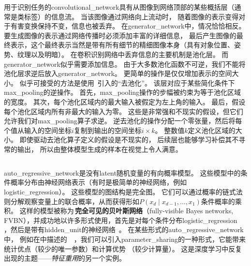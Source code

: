 用于识别任务的\gls{convolutional_network}具有从图像到网络顶部的某些概括层（通常是类标签）的信息流。
当该图像通过网络向上流动时， 随着图像的表示变得对于有害变换保持不变，信息也被丢弃。
在\gls{generator_network}中，情况恰恰相反。
要生成图像的表示通过网络传播时必须添加丰富的详细信息， 最后产生图像的最终表示，这个最终表示当然是带有所有细节的精细图像本身（具有对象位置、姿势、纹理以及明暗）。
在卷积识别网络中丢弃信息的主要机制是池化层。
而\gls{generator_network}似乎需要添加信息。
由于大多数池化函数不可逆，我们不能将池化层求逆后放入\gls{generator_network}。
更简单的操作是仅仅增加表示的空间大小。
似乎可接受的方法是使用~\citet{dosovitskiy2015learning}引入的``去池化''。
该层对应于某些简化条件下\gls{max_pooling}的逆操作。
首先，\gls{max_pooling}操作的步幅被约束为等于池化区域的宽度。
其次，每个池化区域内的最大输入被假定为左上角的输入。
最后，假设每个池化区域内所有非最大的输入为零。
这些是非常强和不现实的假设，但它们允许我们对\gls{max_pooling}算子求逆。
逆去池化的操作分配一个零张量，然后将每个值从输入的空间坐标$i$复制到输出的空间坐标$i \times k$。
整数值$k$定义池化区域的大小。
即使驱动去池化算子定义的假设是不现实的， 后续层也能够学习补偿其不寻常的输出， 所以由整体模型生成的样本在视觉上令人满意。


\subsection{}
\label{sec:auto_regressive_networks}
\gls{auto_regressive_network}是没有\gls{latent}随机变量的有向概率模型。
这些模型中的条件概率分布由神经网络表示（有时是极简单的神经网络，例如\gls{logistic_regression}）。
这些模型的图结构是完全图。
它们可以通过概率的链式法则分解观察变量上的联合概率，从而获得形如$P(x_d \mid x_{d-1},\dots, x_1)$条件概率的乘积。
这样的模型被称为\,\textbf{完全可见的贝叶斯网络}（fully-visible Bayes networks, FVBN），并成功地以许多形式使用，首先是对每个条件分布\gls{logistic_regression}~\citep{Frey98} ，然后是带有\gls{hidden_unit}的神经网络~\citep{Bengio+Bengio-NIPS2000,Larochelle+Murray-2011-small}。
在某些形式的\gls{auto_regressive_network}中， 例如在中描述的~~\citep{Larochelle+Murray-2011-small}，我们可以引入\gls{parameter_sharing}的一种形式，它能带来统计优点（较少的唯一参数）和计算优势 （较少计算量）。
这是深度学习中反复出现的主题——\emph{特征重用}的另一个实例。


\subsection{}
\label{sec:linear_auto_regressive_networks}

